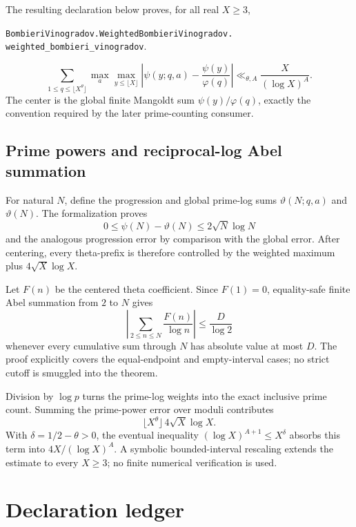 \documentclass[11pt]{amsart}
\newcommand{\leanname}[1]{\nolinkurl{#1}}
\theoremstyle{definition}
\theoremstyle{remark}
\begin{document}
The resulting declaration below proves, for all real $X\geq3$,
\begin{center}
\leanname{BombieriVinogradov.WeightedBombieriVinogradov.}\\
\leanname{weighted_bombieri_vinogradov}.
\end{center}
\[
 \sum_{1\leq q\leq\lfloor X^\theta\rfloor}
 \max_{a}\max_{y\leq\lfloor X\rfloor}
 \left|\psi(y;q,a)-\frac{\psi(y)}{\varphi(q)}\right|
 \ll_{\theta,A}\frac X{(\log X)^A}.
\]
The center is the global finite Mangoldt sum $\psi(y)/\varphi(q)$, exactly
the convention required by the later prime-counting consumer.

\subsection{Prime powers and reciprocal-log Abel summation}

For natural $N$, define the progression and global prime-log sums
$\vartheta(N;q,a)$ and $\vartheta(N)$. The formalization proves
\[
 0\leq\psi(N)-\vartheta(N)\leq2\sqrt N\log N
\]
and the analogous progression error by comparison with the global error.
After centering, every theta-prefix is therefore controlled by the weighted
maximum plus $4\sqrt X\log X$.

Let $F(n)$ be the centered theta coefficient. Since $F(1)=0$, equality-safe
finite Abel summation from $2$ to $N$ gives
\[
 \left|\sum_{2\leq n\leq N}\frac{F(n)}{\log n}\right|
 \leq \frac{D}{\log2}
\]
whenever every cumulative sum through $N$ has absolute value at most $D$.
The proof explicitly covers the equal-endpoint and empty-interval cases; no
strict cutoff is smuggled into the theorem.

Division by $\log p$ turns the prime-log weights into the exact inclusive
prime count. Summing the prime-power error over moduli contributes
\[
 \lfloor X^\theta\rfloor\,4\sqrt X\log X.
\]
With $\delta=1/2-\theta>0$, the eventual inequality
$(\log X)^{A+1}\leq X^\delta$ absorbs this term into
$4X/(\log X)^A$. A symbolic bounded-interval rescaling extends the estimate
to every $X\geq3$; no finite numerical verification is used.

\section{Declaration ledger}
\end{document}
